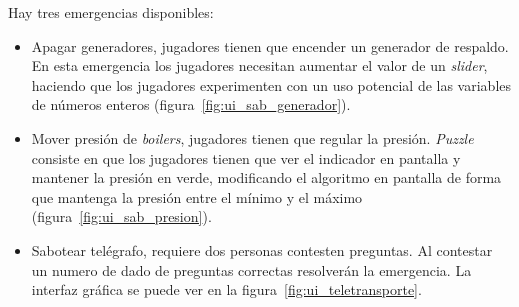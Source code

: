 Hay tres emergencias disponibles:
\begin{itemize}
    \item Apagar generadores, jugadores tienen que encender un generador de respaldo. En esta emergencia los jugadores necesitan aumentar el valor de un \textit{slider}, haciendo que los jugadores experimenten con un uso potencial de las variables de números enteros (figura~\ref{fig:ui_sab_generador}).
    \item Mover presión de \textit{boilers}, jugadores tienen que regular la presión. \textit{Puzzle} consiste en que los jugadores tienen que ver el indicador en pantalla y mantener la presión en verde, modificando el algoritmo en pantalla de forma que mantenga la presión entre el mínimo y el máximo (figura~\ref{fig:ui_sab_presion}).
    \item Sabotear telégrafo, requiere dos personas contesten preguntas. Al contestar un numero de dado de preguntas correctas resolverán la emergencia. La interfaz gráfica se puede ver en la figura~\ref{fig:ui_teletransporte}.
\end{itemize}

